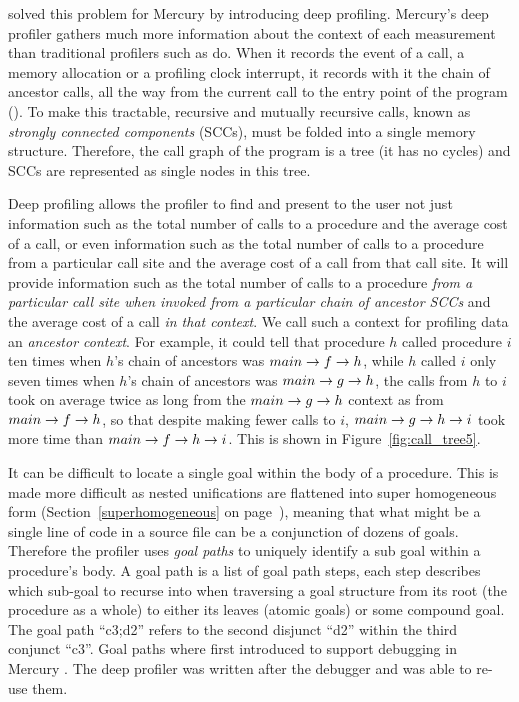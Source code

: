 \citep{conway:2001:mercury-deep}
solved this problem for Mercury by introducing deep profiling.
Mercury's deep profiler gathers much more information about the context of
each measurement than traditional profilers such as  \citep{gprof} do.
When it records the event of a call,
a memory allocation or a profiling clock interrupt,
it records with it the chain of ancestor calls,
all the way from the current call to the entry point of the program
().
To make this tractable,
recursive and mutually recursive calls,
known as \emph{strongly connected components} (SCCs),
must be folded into a single memory structure.
Therefore, the call graph of the program is a tree (it has no cycles)
and SCCs are represented as single nodes in this tree.

Deep profiling allows the profiler to find and present to the user
not just information such as the total number of calls to a procedure
and the average cost of a call,
or even information such as the total number of calls to a procedure
from a particular call site and the average cost of a call from that call
site.
It will provide information such as the total number of calls to a procedure
\emph{from a particular call site
when invoked from a particular chain of ancestor SCCs}
and the average cost of a call \emph{in that context}.
We call such a context for profiling data an \emph{ancestor context}.
For example, it could tell that
procedure $h$ called procedure $i$ ten times
when $h$'s chain of ancestors was $main \rightarrow f \rightarrow h$,
while $h$ called $i$ only seven times
when $h$'s chain of ancestors was $main \rightarrow g \rightarrow h$,
the calls from $h$ to $i$ took on average twice as long
from the $main \rightarrow g \rightarrow h$ context as from $main \rightarrow f \rightarrow h$,
so that despite making fewer calls to $i$,
$main \rightarrow g \rightarrow h \rightarrow i$ took more time than $main \rightarrow f \rightarrow h \rightarrow i$.
This is shown in Figure~\ref{fig:call_tree5}.


It can be difficult to locate a single goal within the body of a procedure.
This is made more difficult as nested unifications are flattened into super
homogeneous form
(Section~\ref{superhomogeneous} on page~\pageref{superhomogeneous}),
meaning that what might be a single line of code in a source file
can be a conjunction of dozens of goals.
Therefore the profiler uses \emph{goal paths} to uniquely identify a sub
goal within a procedure's body.
A goal path is a list of goal path steps, each step describes which
sub-goal to recurse into when traversing a goal structure from its
root (the procedure as a whole)
to either its leaves (atomic goals) or some compound goal.
The goal path ``c3;d2'' refers to the second disjunct ``d2'' within the
third conjunct ``c3''.
Goal paths where first introduced to support debugging in Mercury \citep{mdb}.
The deep profiler was written after the debugger and was able to re-use them.


